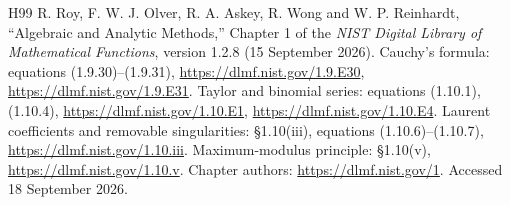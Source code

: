 
\begin{thebibliography}{H99}
R. Roy, F. W. J. Olver, R. A. Askey, R. Wong and W. P. Reinhardt,
``Algebraic and Analytic Methods,'' Chapter 1 of the
\emph{NIST Digital Library of Mathematical Functions},
version 1.2.8 (15 September 2026).
Cauchy's formula: equations (1.9.30)--(1.9.31),
\url{https://dlmf.nist.gov/1.9.E30},
\url{https://dlmf.nist.gov/1.9.E31}.
Taylor and binomial series: equations (1.10.1), (1.10.4),
\url{https://dlmf.nist.gov/1.10.E1},
\url{https://dlmf.nist.gov/1.10.E4}.
Laurent coefficients and removable singularities: \S1.10(iii),
equations (1.10.6)--(1.10.7),
\url{https://dlmf.nist.gov/1.10.iii}.
Maximum-modulus principle: \S1.10(v),
\url{https://dlmf.nist.gov/1.10.v}.
Chapter authors: \url{https://dlmf.nist.gov/1}.
Accessed 18 September 2026.

\end{thebibliography}
